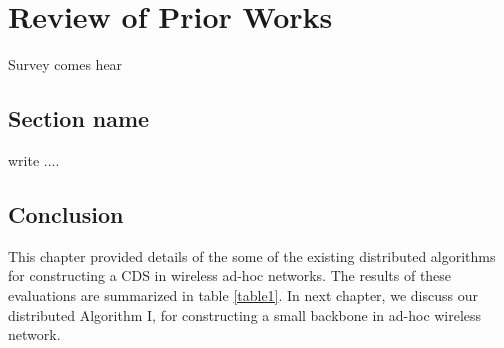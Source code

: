 \chapter{Review of Prior Works}

Survey comes hear

\section{Section name}

write ....

\section{Conclusion}

This chapter provided details of the some of the existing
distributed algorithms for constructing a CDS in wireless ad-hoc
networks. The results of these evaluations are summarized in table
\ref{table1}. In next chapter, we discuss our distributed
Algorithm I, for constructing a small backbone in ad-hoc wireless
network.
